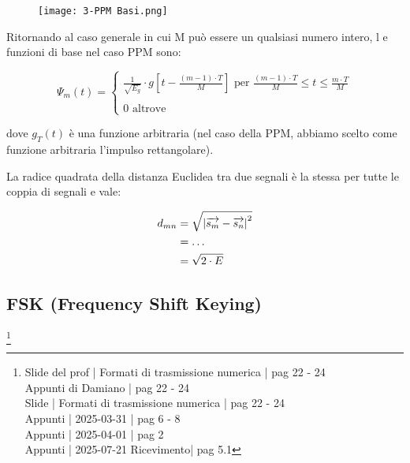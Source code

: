 \begin{figure}[h]
    \centering
    \texttt{[image: 3-PPM Basi.png]}
\end{figure} 

Ritornando al caso generale in cui M può essere un qualsiasi numero intero, l
e funzioni di base nel caso PPM sono: 

{
    \Large 
    \begin{equation}
        \Psi_m (t)
        = 
        \begin{cases}
            \frac{1}{\sqrt{E_g}}
            \cdot 
            g \left[ t - \frac{(m-1) \cdot T}{M}\right]
            \text{ per }
            \frac{(m-1) \cdot T}{M} \le t \le \frac{m \cdot T}{M}
            \\
            \quad
            \\
            0 \text{ altrove}
        \end{cases}
    \end{equation}
}

dove $g_T (t)$ è una funzione arbitraria (nel caso della PPM, abbiamo scelto come funzione arbitraria l'impulso rettangolare). \newline 

La radice quadrata della distanza Euclidea tra due segnali è la stessa per tutte le coppia di segnali e vale:

{
    \Large 
    \begin{equation}
        \begin{split}
            d_{mn}
            &= 
            \sqrt{\abs{\overrightarrow{s_m} - \overrightarrow{s_n}}^{2}}
            \\
            &= 
            \dots
            \\
            &= 
            \sqrt{2 \cdot E}
        \end{split}
    \end{equation}
}

\newpage 

\subsection{FSK (Frequency Shift Keying)}
\footnote{Slide del prof | Formati di trasmissione numerica | pag 22 - 24\\  
Appunti di Damiano | pag 22 - 24\\
Slide | Formati di trasmissione numerica | pag  22 - 24\\
Appunti | 2025-03-31 | pag 6 - 8 \\
Appunti | 2025-04-01 | pag 2 \\
Appunti | 2025-07-21 Ricevimento| pag 5.1
}

